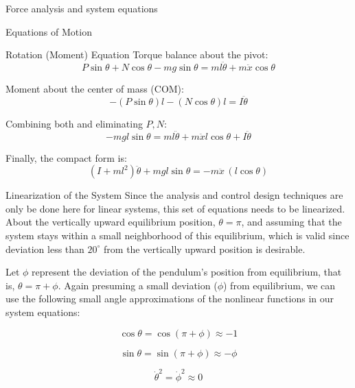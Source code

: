 \begin{frame}{Force analysis and system equations}
\begin{block}{Equations of Motion}
\begin{block}{Rotation (Moment) Equation}
Torque balance about the pivot: \begin{equation}
P \sin \theta + N \cos \theta - mg \sin \theta 
= m l \ddot{\theta} + m \ddot{x} \cos \theta
\end{equation}

Moment about the center of mass (COM): \begin{equation}
-(P \sin \theta) l - (N \cos \theta) l = I \ddot{\theta}
\end{equation}

Combining both and eliminating \(P, N\): \begin{equation}
- m g l \sin \theta = m l \ddot{\theta} + m \ddot{x} l \cos \theta + I \ddot{\theta}
\end{equation}

Finally, the compact form is: \begin{equation}
\boxed{ \left( I + m l^2 \right) \ddot{\theta} + m g l \sin \theta 
= - m \ddot{x} \, (l \cos \theta) }
\end{equation}
\end{block}
\end{block}

\begin{block}{Linearization of the System}
\protect{}\label{linearization-of-the-system}
Since the analysis and control design techniques are only be done here
for linear systems, this set of equations needs to be linearized. About
the vertically upward equilibrium position, \(\theta = \pi\), and
assuming that the system stays within a small neighborhood of this
equilibrium, which is valid since deviation less than \(20^\circ\) from
the vertically upward position is desirable.

Let \(\phi\) represent the deviation of the pendulum's position from
equilibrium, that is, \(\theta = \pi + \phi\). Again presuming a small
deviation (\(\phi\)) from equilibrium, we can use the following small
angle approximations of the nonlinear functions in our system equations:

\begin{equation}
\cos \theta = \cos(\pi + \phi) \approx -1
\end{equation}

\begin{equation}
\sin \theta = \sin(\pi + \phi) \approx -\phi
\end{equation}

\begin{equation}
\dot{\theta}^2 = \dot{\phi}^2 \approx 0
\end{equation}


\end{block}
\end{frame}
